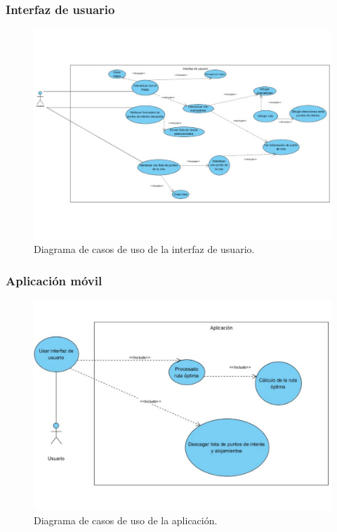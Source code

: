 \subsubsection[Interfaz de usuario]{Interfaz de usuario}
\begin{figure}[H]
	\centering
	\includegraphics[scale=0.5]{imagenes/Interfaz.pdf}
	\caption{Diagrama de casos de uso de la interfaz de usuario.}
	\label{fig:user_interface}
\end{figure}

\subsubsection[Aplicación]{Aplicación móvil}
\begin{figure}[H]
	\centering
	\includegraphics[scale=0.55]{imagenes/Aplicacion.pdf}
	\caption{Diagrama de casos de uso de la aplicación.}
	\label{fig:app}
\end{figure}

